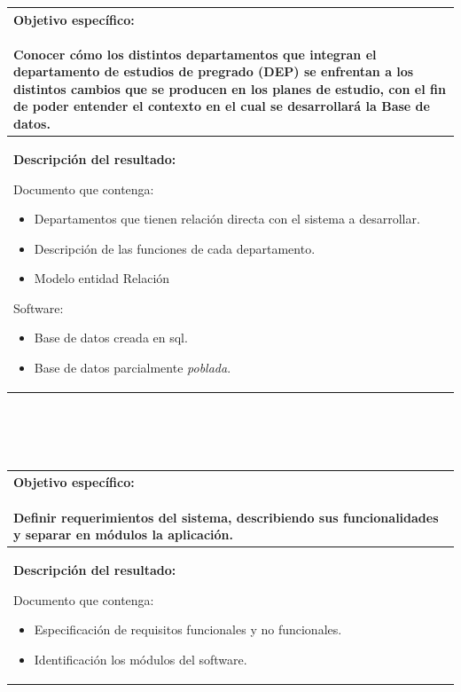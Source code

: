 \documentclass[12pt]{article}
\begin{document}
			\begin{tabular}{ |p{15cm}|} \hline
				 \parbox[c]{15cm}{ {\bf Objetivo específico:}\\ \\Conocer cómo los distintos departamentos que integran el departamento 
				 de estudios de pregrado (DEP) se enfrentan a los distintos cambios que se producen en los planes de estudio, con 
				 el fin de poder entender el contexto en el cual se desarrollará la Base de datos.\\} 
			\\
			 \hline
				 \parbox[c]{15cm}{ {\bf Descripción del resultado:}\\ 
				 
				 Documento que contenga: \\
				 \begin{itemize}
				  \item Departamentos que tienen relación directa con el sistema a desarrollar.
				  \item Descripción de las funciones de cada departamento.
				  \item Modelo entidad Relación
				 \end{itemize}
				  Software: \\
				  \begin{itemize}
				   \item Base de datos creada en sql.
						\item Base de datos parcialmente \textit{poblada}.
				  \end{itemize}

			 
				  } 
			 \\ \hline			 
			 \end{tabular}	
			 \\ \\  \\ 
			\begin{tabular}{ |p{15cm}|} \hline
				 \parbox[c]{15cm}{ {\bf Objetivo específico:}\\ \\ Definir requerimientos del sistema, describiendo 
				 sus funcionalidades y separar en módulos la aplicación.\\} 
			\\
			 \hline
				 \parbox[c]{15cm}{ {\bf Descripción del resultado:}\\ 
				 
			Documento que contenga: \\
				 \begin{itemize}
				  \item Especificación  de requisitos funcionales y no funcionales.
				  \item Identificación los módulos del software.
				
				 \end{itemize}
			
				 
				 
				 } 
			 \\ \hline			 
			 \end{tabular}	
\end{document}
